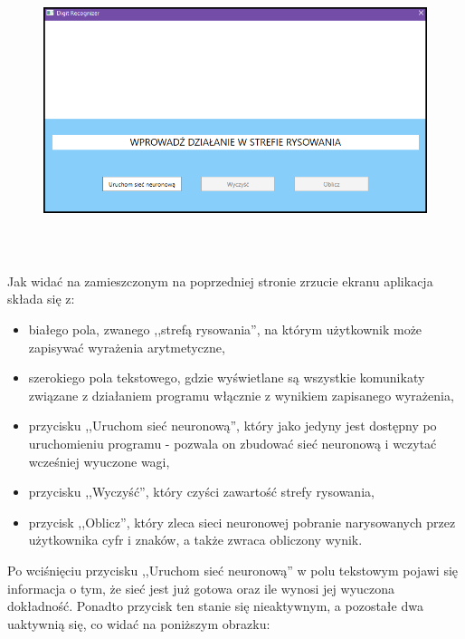 \documentclass[12pt,a4paper]{article}
\begin{document}
	\begin{figure}[h!]
	\centering
	\includegraphics[height=8.5cm]{app.png}
	\end{figure}

\newpage
\noindent Jak widać na zamieszczonym na poprzedniej stronie zrzucie ekranu aplikacja składa się z:
	\begin{itemize}
	\item białego pola, zwanego ,,strefą rysowania'', na którym użytkownik może zapisywać wyrażenia arytmetyczne,
	\item szerokiego pola tekstowego, gdzie wyświetlane są wszystkie komunikaty związane z działaniem programu włącznie z wynikiem zapisanego wyrażenia,
	\item przycisku ,,Uruchom sieć neuronową'', który jako jedyny jest dostępny po uruchomieniu programu - pozwala on zbudować sieć neuronową i wczytać wcześniej wyuczone wagi,
	\item przycisku ,,Wyczyść'', który czyści zawartość strefy rysowania,
	\item przycisk ,,Oblicz'', który zleca sieci neuronowej pobranie narysowanych przez użytkownika cyfr i znaków, a także zwraca obliczony wynik.
	\end{itemize}
	
\vspace{20pt}

Po wciśnięciu przycisku ,,Uruchom sieć neuronową'' w polu tekstowym pojawi się informacja o tym, że sieć jest już gotowa oraz ile wynosi jej wyuczona dokładność. Ponadto przycisk ten stanie się nieaktywnym, a pozostałe dwa uaktywnią się, co widać na poniższym obrazku:
\end{document}

